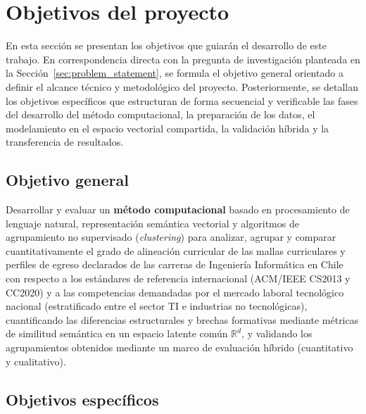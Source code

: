 \section{Objetivos del proyecto}
\label{cap:Proposal}

En esta sección se presentan los objetivos que guiarán el desarrollo de este trabajo. En correspondencia directa con la pregunta de investigación planteada en la Sección~\ref{sec:problem_statement}, se formula el objetivo general orientado a definir el alcance técnico y metodológico del proyecto. Posteriormente, se detallan los objetivos específicos que estructuran de forma secuencial y verificable las fases del desarrollo del método computacional, la preparación de los datos, el modelamiento en el espacio vectorial compartida, la validación híbrida y la transferencia de resultados.

\subsection{Objetivo general}

Desarrollar y evaluar un \textbf{método computacional} basado en procesamiento de lenguaje natural, representación semántica vectorial y algoritmos de agrupamiento no supervisado (\textit{clustering}) para analizar, agrupar y comparar cuantitativamente el grado de alineación curricular de las mallas curriculares y perfiles de egreso declarados de las carreras de Ingeniería Informática en Chile con respecto a los estándares de referencia internacional (ACM/IEEE CS2013 y CC2020) y a las competencias demandadas por el mercado laboral tecnológico nacional (estratificado entre el sector TI e industrias no tecnológicas), cuantificando las diferencias estructurales y brechas formativas mediante métricas de similitud semántica en un espacio latente común $\mathbb{R}^d$, y validando los agrupamientos obtenidos mediante un marco de evaluación híbrido (cuantitativo y cualitativo).

\subsection{Objetivos específicos}


